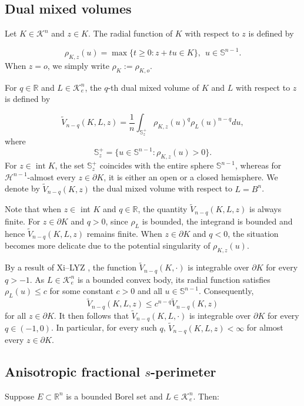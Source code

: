 \documentclass[12pt, oneside,reqno]{amsart}
\numberwithin{equation}{section}
\newtheorem{definition and theorem}[theorem]{Definition and Theorem}
\theoremstyle{plain}
\theoremstyle{remark}
\theoremstyle{definition}
\newcommand{\sn}{{\mathbb S}^{n-1}}
\newcommand{\tr}{\mathbb R}
\newcommand{\tk}{\mathcal{K}}
\newcommand{\tH}{\mathcal{H}}
\begin{document}
\subsection{Dual mixed volumes} Let $K\in\tk^n$ and $z\in K$. The radial function of $K$ with respect to $z$ is defined by

\[\rho_{K,z}(u)=\max\{t\ge0: z+tu\in K\},~~u\in\sn.\]
When $z=o$, we simply write $\rho_K:=\rho_{K,o}$. 

For $q\in\tr$ and $L\in \tk_e^n$, the $q$-th dual mixed volume of $K$ and $L$ with respect to $z$ is defined by
 
\[\tilde{V}_{n-q}(K,L,z)=\frac{1}{n}\int_{\mathbb S_z^+}\rho_{K,z}(u)^{q}\rho_L(u)^{n-q}du,\]
where
\[\mathbb S_z^+=\{u\in\sn: \rho_{K,z}(u)>0\}.\]
For $z \in \operatorname{int} K$, the set $\mathbb S_z^+$ coincides with the entire sphere $\sn$,  
whereas for $\tH^{n-1}$-almost every $z \in \partial K$, it is either an open or a closed hemisphere.  
We denote by $\tilde{V}_{n-q}(K, z)$ the dual mixed volume with respect to $L = B^n$.


Note that when $z\in$ int $K$ and $q\in\tr$, the quantity $\tilde{V}_{n-q}(K,L,z)$ is always finite. For $z\in\partial K$ and $q>0$, since $\rho_L$ is bounded, the integrand is bounded and hence $\tilde{V}_{n-q}(K,L,z)$ remains finite. When $z\in\partial K$ and $q<0$, the situation becomes more delicate due to the potential singularity of $\rho_{K,z}(u)$. 

By a result of Xi–LYZ \cite[Lemma 4.9]{LXYZ2020}, the function \( \tilde{V}_{n-q}(K, \cdot) \) is integrable over \( \partial K \) for every \( q > -1 \). As \( L \in \mathcal{K}_e^n \) is a bounded convex body, its radial function satisfies \( \rho_L(u) \leq c \) for some constant \( c > 0 \) and all \( u \in \sn \). Consequently,
\[
\tilde{V}_{n-q}(K,L,z) \leq c^{n-q} \tilde{V}_{n-q}(K,z)
\]
for all \( z \in \partial K \).  
It then follows that \( \tilde{V}_{n-q}(K,L,\cdot) \) is integrable over \( \partial K \) for every \( q \in (-1,0) \).  
In particular, for every such \( q \), \( \tilde{V}_{n-q}(K,L,z) < \infty \) for almost every \( z \in \partial K \).

\subsection{Anisotropic fractional $s$-perimeter}
Suppose $E \subset \mathbb{R}^n$ is a bounded Borel set and $L \in \mathcal{K}_e^n$. Then:
\end{document}
